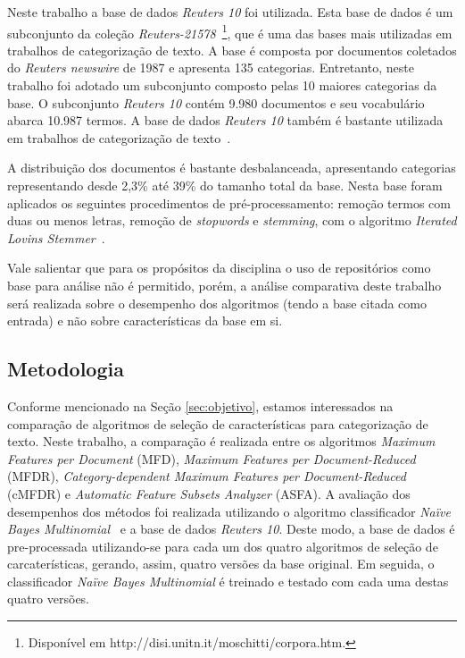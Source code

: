 \documentclass[conference]{IEEEtran}
\begin{document}
Neste trabalho a base de dados \textit{Reuters 10} foi utilizada.
Esta base de dados é um subconjunto da coleção \textit{Reuters-21578}~\footnote{Disponível em http://disi.unitn.it/moschitti/corpora.htm.}, que é uma das bases mais utilizadas em trabalhos de categorização de texto.
A base é composta por documentos coletados do \textit{Reuters newswire} de 1987 e apresenta 135 categorias.
Entretanto, neste trabalho foi adotado um subconjunto composto pelas 10 maiores categorias da base.
O subconjunto \textit{Reuters 10} contém 9.980 documentos e seu vocabulário abarca 10.987 termos.
A base de dados \textit{Reuters 10} também é bastante utilizada em trabalhos de categorização de texto~\cite{chang2008multilabel,chen2009feature,yang2011new}. 

A distribuição dos documentos é bastante desbalanceada, apresentando categorias representando desde 2,3\% até 39\% do tamanho total da base. 
Nesta base foram aplicados os seguintes procedimentos de pré-processamento:
remoção termos com duas ou menos letras, remoção de \textit{stopwords} e \textit{stemming}, com o algoritmo \textit{Iterated Lovins
Stemmer}~\cite{lovins1968development}.

Vale salientar que para os propósitos da disciplina o uso de repositórios como base para análise não é permitido, porém, a análise comparativa deste trabalho será realizada sobre o desempenho dos algoritmos (tendo a base citada como entrada) e não sobre características da base em si.

\subsection{Metodologia}
\label{sec:metodologia}

Conforme mencionado na Seção \ref{sec:objetivo}, estamos interessados na comparação de algoritmos de seleção de características para categorização de texto.
Neste trabalho, a comparação é realizada entre os algoritmos \textit{Maximum Features per Document} (MFD), \textit{Maximum Features per Document-Reduced} (MFDR), \textit{Category-dependent Maximum Features per Document-Reduced} (cMFDR) e \textit{Automatic Feature Subsets Analyzer} (ASFA). A avaliação dos desempenhos dos métodos foi realizada utilizando o algoritmo classificador \textit{Na\"ive Bayes Multinomial}~\cite{mccallum1998comparison} e a base de dados \textit{Reuters 10}. Deste modo, a base de dados é pre-processada utilizando-se para cada um dos quatro algoritmos de seleção de carcaterísticas, gerando, assim, quatro versões da base original. Em seguida, o classificador \textit{Na\"ive Bayes Multinomial} é  treinado e testado com cada uma destas quatro versões.
\end{document}
